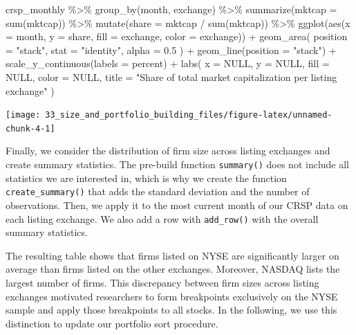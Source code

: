 \documentclass[
]{krantz}
\newenvironment{Shaded}{\begin{snugshade}}{\end{snugshade}}
\newcommand{\AttributeTok}[1]{\textcolor[rgb]{0.61,0.61,0.61}{#1}}
\newcommand{\ConstantTok}[1]{\textcolor[rgb]{0,0,0}{#1}}
\newcommand{\FloatTok}[1]{\textcolor[rgb]{0.06,0.06,0.06}{#1}}
\newcommand{\FunctionTok}[1]{\textcolor[rgb]{0,0,0}{#1}}
\newcommand{\NormalTok}[1]{#1}
\newcommand{\SpecialCharTok}[1]{\textcolor[rgb]{0,0,0}{#1}}
\newcommand{\StringTok}[1]{\textcolor[rgb]{0.5,0.5,0.5}{#1}}
\begin{document}
\begin{Shaded}
\begin{Highlighting}[]
\NormalTok{crsp\_monthly }\SpecialCharTok{\%\textgreater{}\%}
  \FunctionTok{group\_by}\NormalTok{(month, exchange) }\SpecialCharTok{\%\textgreater{}\%}
  \FunctionTok{summarize}\NormalTok{(}\AttributeTok{mktcap =} \FunctionTok{sum}\NormalTok{(mktcap)) }\SpecialCharTok{\%\textgreater{}\%}
  \FunctionTok{mutate}\NormalTok{(}\AttributeTok{share =}\NormalTok{ mktcap }\SpecialCharTok{/} \FunctionTok{sum}\NormalTok{(mktcap)) }\SpecialCharTok{\%\textgreater{}\%}
  \FunctionTok{ggplot}\NormalTok{(}\FunctionTok{aes}\NormalTok{(}\AttributeTok{x =}\NormalTok{ month, }\AttributeTok{y =}\NormalTok{ share, }\AttributeTok{fill =}\NormalTok{ exchange, }\AttributeTok{color =}\NormalTok{ exchange)) }\SpecialCharTok{+}
  \FunctionTok{geom\_area}\NormalTok{(}
    \AttributeTok{position =} \StringTok{"stack"}\NormalTok{,}
    \AttributeTok{stat =} \StringTok{"identity"}\NormalTok{,}
    \AttributeTok{alpha =} \FloatTok{0.5}
\NormalTok{  ) }\SpecialCharTok{+}
  \FunctionTok{geom\_line}\NormalTok{(}\AttributeTok{position =} \StringTok{"stack"}\NormalTok{) }\SpecialCharTok{+}
  \FunctionTok{scale\_y\_continuous}\NormalTok{(}\AttributeTok{labels =}\NormalTok{ percent) }\SpecialCharTok{+}
  \FunctionTok{labs}\NormalTok{(}
    \AttributeTok{x =} \ConstantTok{NULL}\NormalTok{, }\AttributeTok{y =} \ConstantTok{NULL}\NormalTok{, }\AttributeTok{fill =} \ConstantTok{NULL}\NormalTok{, }\AttributeTok{color =} \ConstantTok{NULL}\NormalTok{,}
    \AttributeTok{title =} \StringTok{"Share of total market capitalization per listing exchange"}
\NormalTok{  )}
\end{Highlighting}
\end{Shaded}

\begin{center}\texttt{[image: 33\_size\_and\_portfolio\_building\_files/figure-latex/unnamed-chunk-4-1]} \end{center}

Finally, we consider the distribution of firm size across listing exchanges and create summary statistics. The pre-build function \texttt{summary()} does not include all statistics we are interested in, which is why we create the function \texttt{create\_summary()} that adds the standard deviation and the number of observations. Then, we apply it to the most current month of our CRSP data on each listing exchange. We also add a row with \texttt{add\_row()} with the overall summary statistics.

The resulting table shows that firms listed on NYSE are significantly larger on average than firms listed on the other exchanges. Moreover, NASDAQ lists the largest number of firms. This discrepancy between firm sizes across listing exchanges motivated researchers to form breakpoints exclusively on the NYSE sample and apply those breakpoints to all stocks. In the following, we use this distinction to update our portfolio sort procedure.
\end{document}
